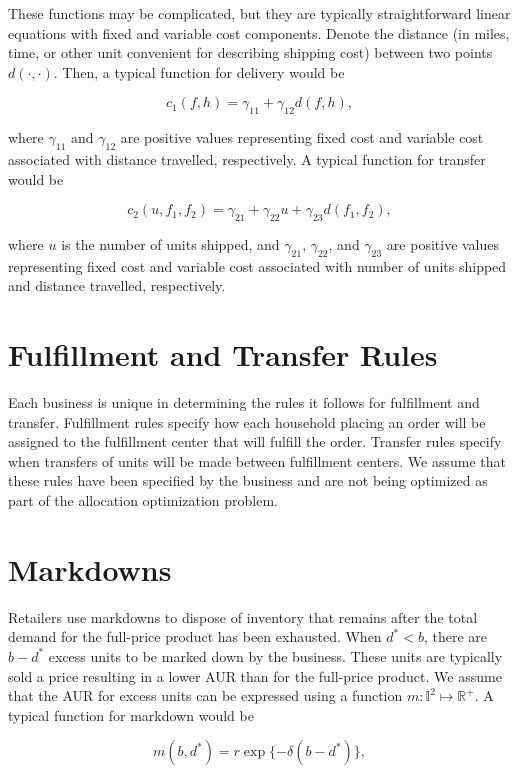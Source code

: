 \documentclass[11pt, oneside]{article}   	%
\begin{document}
These functions may be complicated, but they are typically straightforward linear equations with fixed and variable cost components.  Denote the distance (in miles, time, or other unit convenient for describing shipping cost) between two points $d(\cdot, \cdot)$.  Then, a typical function for delivery would be

$$c_1 (f, h) = \gamma_{11} + \gamma_{12} d(f, h),$$

\noindent where $\gamma_{11}$ and $\gamma_{12}$ are positive values representing fixed cost and variable cost associated with distance travelled, respectively.  A typical function for transfer would be

$$c_2 (u, f_1, f_2) = \gamma_{21} + \gamma_{22} u + \gamma_{23} d(f_1, f_2),$$

\noindent where $u$ is the number of units shipped, and $\gamma_{21}$, $\gamma_{22}$, and $\gamma_{23}$ are positive values representing fixed cost and variable cost associated with number of units shipped and distance travelled, respectively.

\section{Fulfillment and Transfer Rules}

Each business is unique in determining the rules it follows for fulfillment and transfer.  Fulfillment rules specify how each household placing an order will be assigned to the fulfillment center that will fulfill the order.  Transfer rules specify when transfers of units will be made between fulfillment centers.  We assume that these rules have been specified by the business and are not being optimized as part of the allocation optimization problem.

\section{Markdowns}

Retailers use markdowns to dispose of inventory that remains after the total demand for the full-price product has been exhausted.  When $d^* < b$, there are $b - d^*$ excess units to be marked down by the business.  These units are typically sold a price resulting in a lower AUR than for the full-price product.  We assume that the AUR for excess units can be expressed using a function $m \colon \mathbb{I}^2 \mapsto \mathbb{R}^+$.  A typical function for markdown would be

$$m (b, d^*) = r \exp \{- \delta (b - d^*) \},$$
\end{document}
